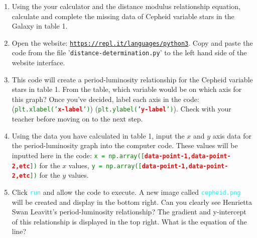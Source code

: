 \documentclass{article}
\newenvironment{white}{\color{white}}{\ignorespacesafterend}
\begin{document}
    \begin{tcolorbox}[enhanced,attach boxed title to top center={yshift=-3mm,yshifttext=-1mm},colback=dblue!90!white,colframe=dblue!80!white,colbacktitle=dblue!80!black,title=Activity 1 - Distance Determination,fonttitle=\bfseries,boxed title style={size=small,colframe=dblue!80!black}]
        \begin{bfseries}
        \begin{white}
            \begin{enumerate}
                
                \item Using the your calculator and the distance modulus relationship equation, calculate and complete the missing data of Cepheid variable stars in the Galaxy in table 1.
                
                \item Open the website: \href{https://repl.it/languages/python3}{\texttt{https://repl.it/languages/python3}}. Copy and paste the code from the file '\texttt{distance-determination.py}' to the left hand side of the website interface. 
                
                \item This code will create a period-luminosity relationship for the Cepheid variable stars in table 1. From the table, which variable would be on which axis for this graph? Once you've decided, label each axis in the code: (\texttt{\textcolor{green}{plt.xlabel('}\textbf{\textcolor{red}{x-label}}\textcolor{green}{')}}) (\texttt{\textcolor{green}{plt.ylabel(}'\textbf{\textcolor{red}{y-label}}\textcolor{green}{')}}). Check with your teacher before moving on to the next step.
                
                \item Using the data you have calculated in table 1, input the \(x\) and \(y\) axis data for the period-luminosity graph into the computer code. These values will be inputted here in the code: \texttt{\textcolor{green}{x = np.array([}\textbf{\textcolor{red}{data-point-1,data-point-2,etc}}\textcolor{green}{])}} for the \(x\) values, \texttt{\textcolor{green}{y = np.array([}\textbf{\textcolor{red}{data-point-1,data-point-2,etc}}\textcolor{green}{])}} for the \(y\) values. 
                
                \item Click \texttt{\textcolor{cyan}{run}} and allow the code to execute. A new image called \texttt{\textcolor{cyan}{cepheid.png}} will be created and display in the bottom right. Can you clearly see Henrietta Swan Leavitt's period-luminosity relationship? The gradient and y-intercept of this relationship is displayed in the top right. What is the equation of the line?
                

\end{enumerate}
\end{white}
\end{bfseries}
\end{tcolorbox}
\end{document}
